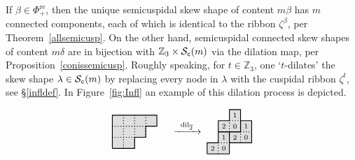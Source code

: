 \documentclass[Unicode,ALCO]{cedram}
\newcommand{\infl}{\operatorname{dil}}
\newcommand{\SSSS}{\mathcal{S}}
\newcommand{\0}{{\bar 0}}
\newcommand{\ZZ}{{\mathbb Z}}
\def\re{{\mathrm{re}}}
\newcommand{\hackcenter}[1]{
 \xy (0,0)*{#1}; \endxy}
\begin{document}
\begin{exam}
If \(\beta \in \Phi_+^\re\), then the unique semicuspidal skew shape of content \(m \beta\) has \(m\) connected components, each of which is identical to the ribbon \(\zeta^\beta\), per Theorem~\ref{allsemicusp}. On the other hand, semicuspidal connected skew shapes of content \(m \delta\) are in bijection with \(\ZZ_3 \times \SSSS_{\tt c}(m)\) via the dilation map, per Proposition~\ref{conissemicusp}. Roughly speaking, for \(t \in \ZZ_3\), one `\(t\)-dilates' the skew shape \(\lambda \in \SSSS_{\tt c}(m)\) by replacing every node in \(\lambda\) with the cuspidal ribbon \(\zeta^{t}\), see \S\ref{infldef}. In Figure~\ref{fig:Infl} an example of this dilation process is depicted.
\begin{figure}
\begin{align*}
{}
\hackcenter{
\begin{tikzpicture}[scale=0.4]
\draw[thick, fill=lightgray!50]  (0,0)--(2,0)--(2,1)--(3,1)--(3,2)--(4,2)--(4,3)--(0,3)--(0,0);
\draw[thick, dotted] (0,1)--(2,1);
\draw[thick, dotted] (0,2)--(3,2);
\draw[thick, dotted] (1,0)--(1,3);
\draw[thick, dotted] (2,0)--(2,3);
\draw[thick, dotted] (3,1)--(3,3);
\end{tikzpicture}
}
\;\;\;\;\;
\xrightarrow{\;\;\infl_{\overline 2}\;\;}
\;
\hackcenter{
\begin{tikzpicture}[scale=0.4]
\pgfmathsetmacro{\ex}{0}
\pgfmathsetmacro{\ey}{0}
\draw[thick, fill=lightgray!50]  (\ex,\ey)--(\ex+2,\ey)--(\ex+2,\ey+2)--(\ex+1,\ey+2)--(\ex+1,\ey+1)--(\ex,\ey+1)--(\ex,\ey);
\draw[thick, dotted] (\ex+1,\ey)--(\ex+1,\ey+1);
\draw[thick, dotted] (\ex+1,\ey+1)--(\ex+2,\ey+1);
\node at (\ex+0.5,\ey+0.5){$\scriptstyle2 $};
\node at (\ex+1.5,\ey+0.5){$\scriptstyle0 $};
\node at (\ex+1.5,\ey+1.5){$\scriptstyle1 $};
\pgfmathsetmacro{\ex}{2}
\pgfmathsetmacro{\ey}{1}
\draw[thick, fill=lightgray!50]  (\ex,\ey)--(\ex+2,\ey)--(\ex+2,\ey+2)--(\ex+1,\ey+2)--(\ex+1,\ey+1)--(\ex,\ey+1)--(\ex,\ey);
\draw[thick, dotted] (\ex+1,\ey)--(\ex+1,\ey+1);
\draw[thick, dotted] (\ex+1,\ey+1)--(\ex+2,\ey+1);
\node at (\ex+0.5,\ey+0.5){$\scriptstyle2 $};
\node at (\ex+1.5,\ey+0.5){$\scriptstyle0 $};
\node at (\ex+1.5,\ey+1.5){$\scriptstyle1 $};
\pgfmathsetmacro{\ex}{1}
\pgfmathsetmacro{\ey}{2}
\draw[thick, fill=lightgray!50]  (\ex,\ey)--(\ex+2,\ey)--(\ex+2,\ey+2)--(\ex+1,\ey+2)--(\ex+1,\ey+1)--(\ex,\ey+1)--(\ex,\ey);
\draw[thick, dotted] (\ex+1,\ey)--(\ex+1,\ey+1);
\draw[thick, dotted] (\ex+1,\ey+1)--(\ex+2,\ey+1);
\node at (\ex+0.5,\ey+0.5){$\scriptstyle2 $};
\node at (\ex+1.5,\ey+0.5){$\scriptstyle0 $};
\node at (\ex+1.5,\ey+1.5){$\scriptstyle1 $};
\pgfmathsetmacro{\ex}{2}

\end{tikzpicture}}
\end{align*}
\end{figure}
\end{exam}
\end{document}
